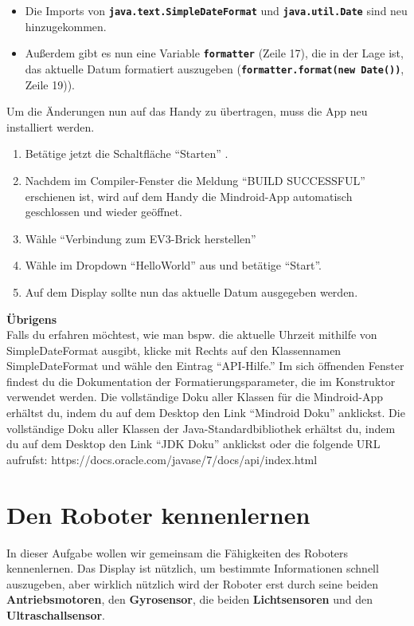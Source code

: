 \documentclass[
	12pt,
	article,
	type=bsc, %
	colorbacktitle,
	instlogo,
	accentcolor=tud1c,
	german,
	twoside
]{tudexercise}
\newcommand{\solpath}[0]{../../impl/androidApp/app/src/main/java/org/mindroid/android/app/workshopSolutions}
\newcommand{\bfcode}[1]{\texttt{\textbf{#1}}}
\begin{document}
	
	\begin{itemize}
	\item Die Imports von \bfcode{java.text.SimpleDateFormat} und \bfcode{java.util.Date} sind neu hinzugekommen.
	\item Außerdem gibt es nun eine Variable \bfcode{formatter} (Zeile 17), die in der Lage ist, das aktuelle Datum formatiert auszugeben (\bfcode{formatter.format(new Date())}, Zeile 19)).
	\end{itemize}
	Um die Änderungen nun auf das Handy zu übertragen, muss die App neu installiert werden.
	\begin{enumerate}
	\item Betätige jetzt die Schaltfläche “Starten” .
	\item Nachdem im Compiler-Fenster die Meldung “BUILD SUCCESSFUL” erschienen ist, wird auf dem Handy die Mindroid-App automatisch geschlossen und wieder geöffnet.
	\item Wähle “Verbindung zum EV3-Brick herstellen”
	\item Wähle im Dropdown “HelloWorld” aus und betätige “Start”.
	\item Auf dem Display sollte nun das aktuelle Datum ausgegeben werden.
	
	\end{enumerate}
	
\textbf{Übrigens}\\
	
Falls du erfahren möchtest, wie man bspw. die aktuelle Uhrzeit mithilfe von SimpleDateFormat ausgibt, klicke mit Rechts auf den Klassennamen SimpleDateFormat und wähle den Eintrag “API-Hilfe.” Im sich öffnenden Fenster findest du die Dokumentation der Formatierungsparameter, die im Konstruktor verwendet werden.
Die vollständige Doku aller Klassen für die Mindroid-App erhältst du, indem du auf dem Desktop den Link “Mindroid Doku” anklickst.
Die vollständige Doku aller Klassen der Java-Standardbibliothek erhältst du, indem du auf dem Desktop den Link “JDK Doku” anklickst oder die folgende URL aufrufst: https://docs.oracle.com/javase/7/docs/api/index.html 


\section{Den Roboter kennenlernen}
In dieser Aufgabe wollen wir gemeinsam die Fähigkeiten des Roboters kennenlernen. Das Display ist nützlich, um bestimmte Informationen schnell auszugeben, aber wirklich nützlich wird der Roboter erst durch seine beiden \textbf{Antriebsmotoren}, den \textbf{Gyrosensor}, die beiden \textbf{Lichtsensoren} und den \textbf{Ultraschallsensor}.
\end{document}
